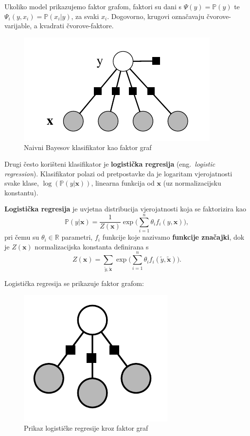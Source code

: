 \documentclass[a4paper,twoside,12pt]{memoir} %
\newcommand{\ti}[1]{\textit{#1\/}}
\newcommand{\tb}{\textbf}
\begin{document}
	Ukoliko model prikazujemo faktor grafom, faktori su dani s $\Psi(y) = \mathbb{P}(y)$ te $\Psi_i(y, x_i) = \mathbb{P}(x_i|y)$, za svaki $x_i$. Dogovorno, krugovi označavaju čvorove-varijable, a kvadrati čvorove-faktore.

	\begin{figure}[H]
		\centering
		\includegraphics[scale = 0.5]{bayes_factor_graph.png}
		\caption{Naivni Bayesov klasifikator kao faktor graf}
	\end{figure}

	Drugi često korišteni klasifikator je \tb{logistička regresija} (eng.~\ti{logistic regression}). Klasifikator polazi od pretpostavke da je logaritam vjerojatnosti svake klase, $\log(\mathbb{P}(y|\mathbf{x}))$, linearna funkcija od $\mathbf{x}$ (uz normalizacijsku konstantu).

	\begin{defn} \tb{Logistička regresija} je uvjetna distribucija vjerojatnosti koja se faktorizira kao
		\begin{equation*}
		\mathbb{P}(y|\mathbf{x}) = \frac{1}{Z(\mathbf{x})} \exp \bigg(\sum_{i=1}^{n} \theta_i f_i(y, \mathbf{x})\bigg),
		\end{equation*}
		pri čemu su $\theta_i \in \mathbb{R}$ parametri, $f_i$ funkcije koje nazivamo \tb{funkcije značajki}, dok je $Z(\mathbf{x})$ normalizacijska konstanta definirana s
		\begin{equation*}
		Z(\mathbf{x}) = \sum_{\tilde{y},\tilde{\mathbf{x}}} \exp \bigg(\sum_{i=1}^{n} \theta_i f_i(\tilde{y}, \tilde{\mathbf{x}})\bigg).
		\end{equation*}
	\end{defn}

	Logistička regresija se prikazuje faktor grafom:

	\begin{figure}[H]
		\centering
		\includegraphics[scale = 0.35]{logistic.png}
		\caption{Prikaz logističke regresije kroz faktor graf}
	\end{figure}
\end{document}
